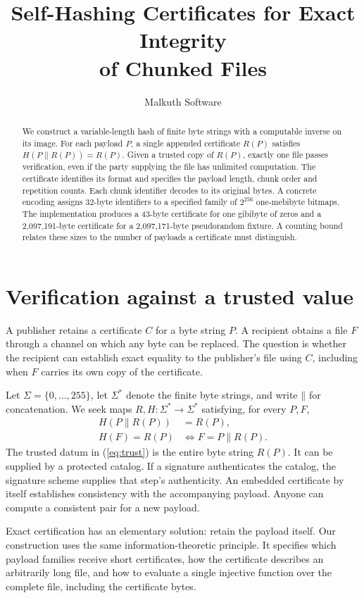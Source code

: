 \documentclass[10pt,twocolumn,letterpaper]{article}
\title{\vspace{-2.5em}\bfseries Self-Hashing Certificates for Exact Integrity\\of Chunked Files}
\author{\normalsize Malkuth Software}
\date{}
\newcommand{\cat}{\mathbin{\|}}
\begin{document}
\maketitle
\begin{abstract}
We construct a variable-length hash of finite byte strings with a computable inverse on its image. For each payload \(P\), a single appended certificate \(R(P)\) satisfies \(H(P\cat R(P))=R(P)\). Given a trusted copy of \(R(P)\), exactly one file passes verification, even if the party supplying the file has unlimited computation. The certificate identifies its format and specifies the payload length, chunk order and repetition counts. Each chunk identifier decodes to its original bytes. A concrete encoding assigns 32-byte identifiers to a specified family of \(2^{256}\) one-mebibyte bitmaps. The implementation produces a 43-byte certificate for one gibibyte of zeros and a 2,097,191-byte certificate for a 2,097,171-byte pseudorandom fixture. A counting bound relates these sizes to the number of payloads a certificate must distinguish.
\end{abstract}

\section{Verification against a trusted value}
A publisher retains a certificate \(C\) for a byte string \(P\). A recipient obtains a file \(F\) through a channel on which any byte can be replaced. The question is whether the recipient can establish exact equality to the publisher's file using \(C\), including when \(F\) carries its own copy of the certificate.

Let \(\Sigma=\{0,\ldots,255\}\), let \(\Sigma^*\) denote the finite byte strings, and write \(\cat\) for concatenation. We seek maps \(R,H:\Sigma^*\to\Sigma^*\) satisfying, for every \(P,F\),
\begin{align}
 H(P\cat R(P)) &= R(P), \label{eq:fixed}\\
 H(F)=R(P) &\iff F=P\cat R(P). \label{eq:trust}
\end{align}
The trusted datum in (\ref{eq:trust}) is the entire byte string \(R(P)\). It can be supplied by a protected catalog. If a signature authenticates the catalog, the signature scheme supplies that step's authenticity. An embedded certificate by itself establishes consistency with the accompanying payload. Anyone can compute a consistent pair for a new payload.

Exact certification has an elementary solution: retain the payload itself. Our construction uses the same information-theoretic principle. It specifies which payload families receive short certificates, how the certificate describes an arbitrarily long file, and how to evaluate a single injective function over the complete file, including the certificate bytes.
\end{document}
